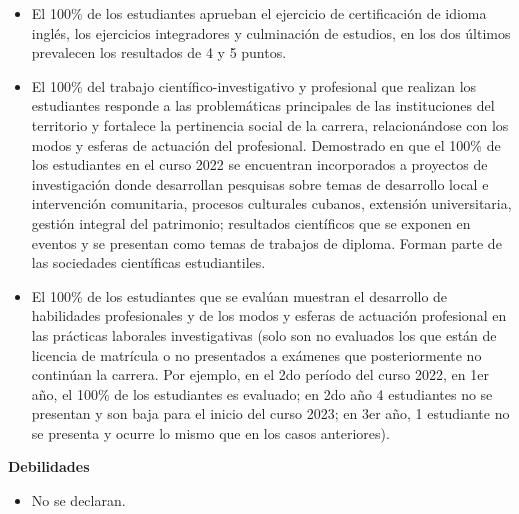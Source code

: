 \begin{itemize}
	\item El 100\% de los estudiantes aprueban el ejercicio de certificación de idioma inglés, los ejercicios integradores y culminación de estudios, en los dos últimos prevalecen los resultados de 4 y 5 puntos. 
	
	\item El 100\% del trabajo científico-investigativo y profesional que realizan los estudiantes responde a las problemáticas principales de las instituciones del territorio y fortalece la pertinencia social de la carrera, relacionándose con los modos y esferas de actuación del profesional. Demostrado en que el 100\% de los estudiantes en el curso 2022 se encuentran incorporados a proyectos de investigación donde desarrollan pesquisas sobre temas de desarrollo local e intervención comunitaria, procesos culturales cubanos, extensión universitaria, gestión integral del patrimonio; resultados científicos que se exponen en eventos y se presentan como temas de trabajos de diploma. Forman parte de las sociedades científicas estudiantiles.
	
	\item El 100\% de los estudiantes que se evalúan muestran el desarrollo de habilidades profesionales y de los modos y esferas de actuación profesional en las prácticas laborales investigativas (solo son no evaluados los que están de licencia de matrícula o no presentados a exámenes que posteriormente no continúan la carrera. Por ejemplo, en el 2do período del curso 2022, en 1er año, el 100\% de los estudiantes es evaluado; en 2do año 4 estudiantes no se presentan y son baja para el inicio del curso 2023; en 3er año, 1 estudiante no se presenta y ocurre lo mismo que en los casos anteriores).
\end{itemize}

\textbf{Debilidades}

\begin{itemize}
	\setlength\itemsep{-0.5em}
	\item No se declaran.
\end{itemize}